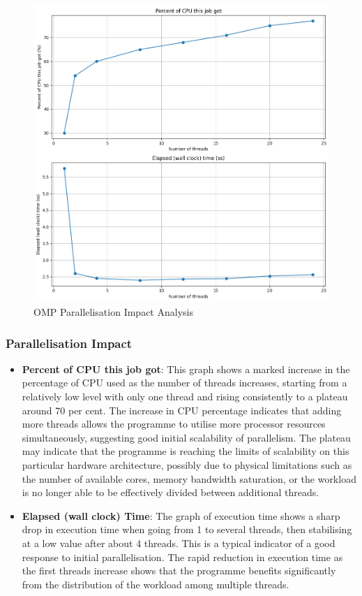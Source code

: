 \documentclass[
]{article}
\begin{document}
\begin{figure}
\includegraphics[width=1\linewidth]{figures/par_omp.png}
\caption{OMP Parallelisation Impact Analysis}
\label{}
\end{figure}

\subsubsection{Parallelisation Impact}\label{parallelisation-impact}

\begin{itemize}
\item
  \textbf{Percent of CPU this job got}: This graph shows a marked
  increase in the percentage of CPU used as the number of threads
  increases, starting from a relatively low level with only one thread
  and rising consistently to a plateau around 70 per cent. The increase
  in CPU percentage indicates that adding more threads allows the
  programme to utilise more processor resources simultaneously,
  suggesting good initial scalability of parallelism. The plateau may
  indicate that the programme is reaching the limits of scalability on
  this particular hardware architecture, possibly due to physical
  limitations such as the number of available cores, memory bandwidth
  saturation, or the workload is no longer able to be effectively
  divided between additional threads.
\item
  \textbf{Elapsed (wall clock) Time}: The graph of execution time shows
  a sharp drop in execution time when going from 1 to several threads,
  then stabilising at a low value after about 4 threads. This is a
  typical indicator of a good response to initial parallelisation. The
  rapid reduction in execution time as the first threads increase shows
  that the programme benefits significantly from the distribution of the
  workload among multiple threads.
\end{itemize}
\end{document}
